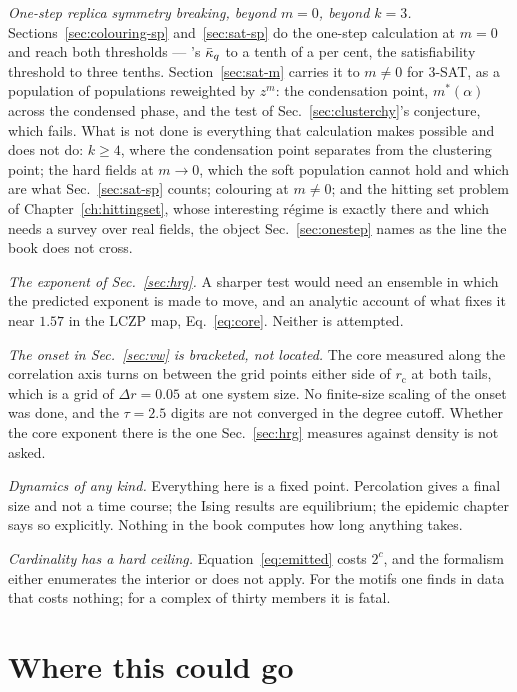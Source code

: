 \emph{One-step replica symmetry breaking, beyond $m=0$, beyond $k=3$.}
Sections~\ref{sec:colouring-sp} and~\ref{sec:sat-sp} do the one-step
calculation at $m=0$ and reach both thresholds --- \citeauthor{mulet2002}'s
$\bar\kappa_{q}$ to a tenth of a per cent, the satisfiability threshold to three
tenths. Section~\ref{sec:sat-m} carries it to $m\ne0$ for $3$-SAT, as a
population of populations reweighted by $z^{m}$: the condensation point,
$m^{*}(\alpha)$ across the condensed phase, and the test of
Sec.~\ref{sec:clusterchy}'s conjecture, which fails. What is not done is
everything that calculation makes possible and does not do: $k\ge4$, where
the condensation point separates from the clustering point; the hard
fields at $m\to0$, which the soft population cannot hold and which are what
Sec.~\ref{sec:sat-sp} counts; colouring at $m\ne0$; and the hitting set
problem of Chapter~\ref{ch:hittingset}, whose interesting r\'egime is exactly
there and which needs a survey over real fields, the object
Sec.~\ref{sec:onestep} names as the line the book does not cross.

\emph{The exponent of Sec.~\ref{sec:hrg}.} A sharper test would need an ensemble
in which the predicted exponent is made to move, and an analytic account of what
fixes it near $1.57$ in the LCZP map, Eq.~\eqref{eq:core}. Neither is
attempted.

\emph{The onset in Sec.~\ref{sec:vw} is bracketed, not located.} The core
measured along the correlation axis turns on between the grid points either
side of $r_{\mathrm{c}}$ at both tails, which is a grid of $\Delta r=0.05$ at
one system size. No finite-size scaling of the onset was done, and the
$\tau=2.5$ digits are not converged in the degree cutoff. Whether the core
exponent there is the one Sec.~\ref{sec:hrg} measures against density is not
asked.

\emph{Dynamics of any kind.} Everything here is a fixed point. Percolation gives
a final size and not a time course; the Ising results are equilibrium; the
epidemic chapter says so explicitly. Nothing in the book computes how long
anything takes.

\emph{Cardinality has a hard ceiling.} Equation~\eqref{eq:emitted} costs
$2^{c}$, and the formalism either enumerates the interior or does not apply. For
the motifs one finds in data that costs nothing; for a complex of thirty members
it is fatal.

\section{Where this could go}
\label{sec:whereitgoes}

